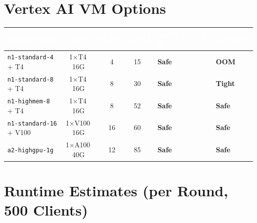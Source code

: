 \documentclass[11pt,a4paper]{article}
\newcommand{\gb}[1]{\SI{#1}{\giga\byte}}
\newcommand{\mobnet}{MobileNetV3-S}
\newcommand{\resnet}{ResNet18}
\begin{document}
\section*{Vertex AI VM Options}

\noindent
\begin{center}
\renewcommand{\arraystretch}{1.35}
\begin{tabular}{
  >{\raggedright\arraybackslash}p{3.5cm}
  c c c
  >{\centering\arraybackslash}p{2cm}
  >{\centering\arraybackslash}p{2cm}}
\toprule
\rowcolor{hdrblue}
\textcolor{white}{\textbf{Machine Type}} &
\textcolor{white}{\textbf{GPUs}} &
\textcolor{white}{\textbf{vCPUs}} &
\textcolor{white}{\textbf{RAM}} &
\textcolor{white}{\textbf{\mobnet{}}} &
\textcolor{white}{\textbf{\resnet{}}} \\
\midrule
\texttt{n1-standard-4} + T4
  & 1$\times$T4\,16G & 4  & \gb{15}
  & \textcolor{accentgreen}{\textbf{Safe}}
  & \textcolor{accentred}{\textbf{OOM}} \\
\rowcolor{rowgray}
\texttt{n1-standard-8} + T4
  & 1$\times$T4\,16G & 8  & \gb{30}
  & \textcolor{accentgreen}{\textbf{Safe}}
  & \textcolor{accentorange}{\textbf{Tight}} \\
\texttt{n1-highmem-8} + T4
  & 1$\times$T4\,16G & 8  & \gb{52}
  & \textcolor{accentgreen}{\textbf{Safe}}
  & \textcolor{accentgreen}{\textbf{Safe}} \\
\rowcolor{rowgray}
\texttt{n1-standard-16} + V100
  & 1$\times$V100\,16G & 16  & \gb{60}
  & \textcolor{accentgreen}{\textbf{Safe}}
  & \textcolor{accentgreen}{\textbf{Safe}} \\
\texttt{a2-highgpu-1g}
  & 1$\times$A100\,40G & 12  & \gb{85}
  & \textcolor{accentgreen}{\textbf{Safe}}
  & \textcolor{accentgreen}{\textbf{Safe}} \\
\bottomrule
\end{tabular}
\end{center}

\section*{Runtime Estimates (per Round, 500 Clients)}
\end{document}
